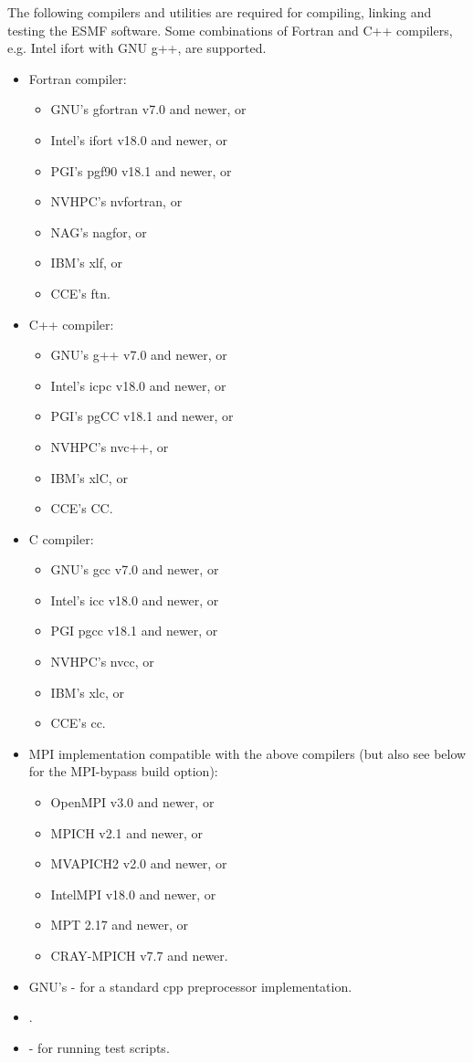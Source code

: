 

The following compilers and utilities are required for compiling, linking and
testing the ESMF software. Some combinations of Fortran and C++ compilers,
e.g. Intel ifort with GNU g++, are supported.
\begin{itemize}
\item Fortran compiler:
  \begin{itemize}
  \item GNU's gfortran v7.0 and newer, or
  \item Intel's ifort v18.0 and newer, or
  \item PGI's pgf90 v18.1 and newer, or
  \item NVHPC's nvfortran, or
  \item NAG's nagfor, or
  \item IBM's xlf, or
  \item CCE's ftn.
  \end{itemize}
\item C++ compiler:
  \begin{itemize}
  \item GNU's g++ v7.0 and newer, or
  \item Intel's icpc v18.0 and newer, or
  \item PGI's pgCC v18.1 and newer, or
  \item NVHPC's nvc++, or
  \item IBM's xlC, or
  \item CCE's CC.
  \end{itemize}
\item C compiler:
  \begin{itemize}
  \item GNU's gcc v7.0 and newer, or
  \item Intel's icc v18.0 and newer, or
  \item PGI pgcc v18.1 and newer, or
  \item NVHPC's nvcc, or
  \item IBM's xlc, or
  \item CCE's cc.
  \end{itemize}
\item MPI implementation compatible with the above compilers (but also see below
for the MPI-bypass build option):
  \begin{itemize}
  \item OpenMPI v3.0 and newer, or
  \item MPICH v2.1 and newer, or
  \item MVAPICH2 v2.0 and newer, or
  \item IntelMPI v18.0 and newer, or
  \item MPT 2.17 and newer, or
  \item CRAY-MPICH v7.7 and newer.
  \end{itemize}
\item GNU's  -
for a standard cpp preprocessor implementation.
\item {}.
\item {} - for running
test scripts.
\end{itemize}

